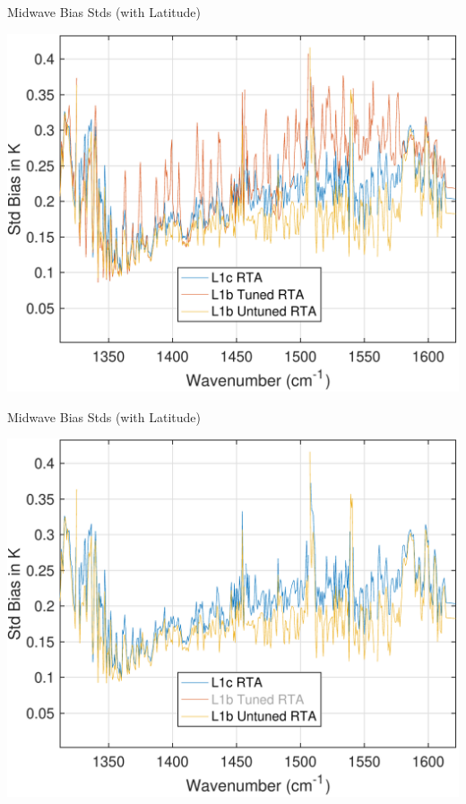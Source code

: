 \documentclass[10pt,t]{beamer}
\begin{document}
\begin{frame}[label={sec:orgfcad398}]{Midwave Bias Stds  (with Latitude)}
\begin{itemize}
\end{itemize}
\begin{center}
\includegraphics[width=0.75\linewidth]{./Talk2/std_3rta_mw.pdf}
\end{center}
\end{frame}

\begin{frame}[label={sec:org6edc0cf,noframenumbering}]{Midwave Bias Stds  (with Latitude)}
\begin{center}
\includegraphics[width=0.75\linewidth]{./Talk2/std_3rta_mw_noL1btuning.pdf}
\end{center}
\end{frame}
\end{document}
